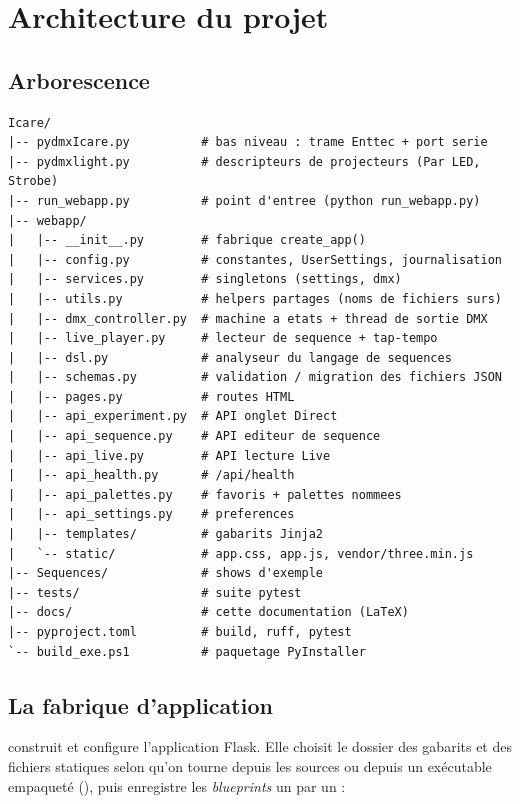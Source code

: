 
\chapter{Architecture du projet}
\label{ch:architecture}

\section{Arborescence}

\begin{lstlisting}[caption={Arborescence du dépôt.},numbers=none]
Icare/
|-- pydmxIcare.py          # bas niveau : trame Enttec + port serie
|-- pydmxlight.py          # descripteurs de projecteurs (Par LED, Strobe)
|-- run_webapp.py          # point d'entree (python run_webapp.py)
|-- webapp/
|   |-- __init__.py        # fabrique create_app()
|   |-- config.py          # constantes, UserSettings, journalisation
|   |-- services.py        # singletons (settings, dmx)
|   |-- utils.py           # helpers partages (noms de fichiers surs)
|   |-- dmx_controller.py  # machine a etats + thread de sortie DMX
|   |-- live_player.py     # lecteur de sequence + tap-tempo
|   |-- dsl.py             # analyseur du langage de sequences
|   |-- schemas.py         # validation / migration des fichiers JSON
|   |-- pages.py           # routes HTML
|   |-- api_experiment.py  # API onglet Direct
|   |-- api_sequence.py    # API editeur de sequence
|   |-- api_live.py        # API lecture Live
|   |-- api_health.py      # /api/health
|   |-- api_palettes.py    # favoris + palettes nommees
|   |-- api_settings.py    # preferences
|   |-- templates/         # gabarits Jinja2
|   `-- static/            # app.css, app.js, vendor/three.min.js
|-- Sequences/             # shows d'exemple
|-- tests/                 # suite pytest
|-- docs/                  # cette documentation (LaTeX)
|-- pyproject.toml         # build, ruff, pytest
`-- build_exe.ps1          # paquetage PyInstaller
\end{lstlisting}

\section{La fabrique d'application}

 construit et configure l'application Flask. Elle choisit
le dossier des gabarits et des fichiers statiques selon qu'on tourne depuis les
sources ou depuis un exécutable empaqueté (), puis enregistre
les \emph{blueprints} un par un :

